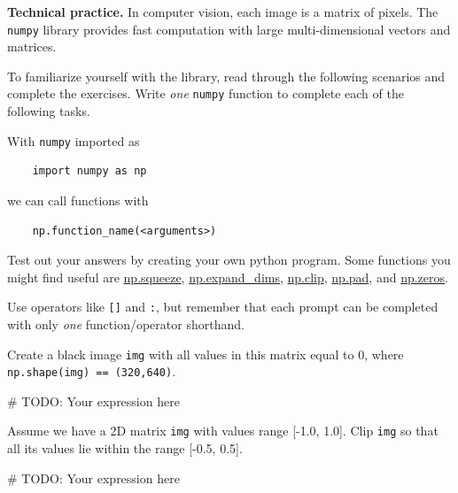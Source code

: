 \documentclass{csci1430}
\begin{document}
\begin{question}[points=7,drawbox=false]
\textbf{Technical practice.} In computer vision, each image is a matrix of pixels. The \texttt{numpy} library provides fast computation with large multi-dimensional vectors and matrices. 

To familiarize yourself with the library, read through the following scenarios and complete the exercises. Write \emph{one} \texttt{numpy} function to complete each of the following tasks.

With \texttt{numpy} imported as
\begin{verbatim}
    import numpy as np
\end{verbatim}
we can call functions with 
\begin{verbatim}
    np.function_name(<arguments>)
\end{verbatim}
Test out your answers by creating your own python program. Some functions you might find useful are \href{https://numpy.org/doc/stable/reference/generated/numpy.squeeze.html}{np.squeeze}, \href{https://numpy.org/doc/stable/reference/generated/numpy.expand_dims.html}{np.expand\_dims}, \href{https://numpy.org/doc/stable/reference/generated/numpy.clip.html}{np.clip}, \href{https://numpy.org/doc/stable/reference/generated/numpy.pad.html}{np.pad}, and \href{https://numpy.org/doc/stable/reference/generated/numpy.zeros.html}{np.zeros}.

Use operators like \texttt{[]} and \texttt{:}, but remember that each prompt can be completed with only \textit{one} function/operator shorthand.
\end{question}

\begin{subquestion}[points=1]
Create a black image \texttt{img} with all values in this matrix equal to 0, where \texttt{np.shape(img) == (320,640)}.
\end{subquestion}
    
\begin{answer}
\begin{python}
# TODO: Your expression here
\end{python}
\end{answer}
    
\begin{subquestion}[points=1]
Assume we have a 2D matrix \texttt{img} with values range [-1.0, 1.0]. Clip \texttt{img} so that all its values lie within the range [-0.5, 0.5].
\end{subquestion}

\begin{answer}
\begin{python}
# TODO: Your expression here
\end{python}
\end{answer}
\end{document}
